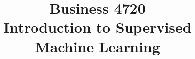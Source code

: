 \documentclass{article}
\title{Business 4720\\ \vspace{\baselineskip}
Introduction to Supervised Machine Learning}
\begin{document}
\maketitle

\vfill

\clearpage


\end{document}
